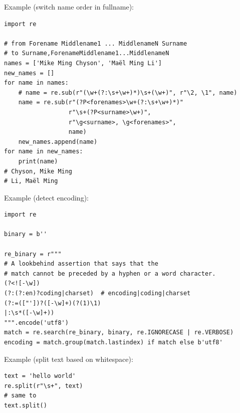 Example (switch name order in fullname):
\begin{lstlisting}
import re

# from Forename Middlename1 ... MiddlenameN Surname
# to Surname,ForenameMiddlename1...MiddlenameN
names = ['Mike Ming Chyson', 'Maël Ming Li']
new_names = []
for name in names:
    # name = re.sub(r"(\w+(?:\s+\w+)*)\s+(\w+)", r"\2, \1", name)
    name = re.sub(r"(?P<forenames>\w+(?:\s+\w+)*)"
                  r"\s+(?P<surname>\w+)",
                  r"\g<surname>, \g<forenames>",
                  name)
    new_names.append(name)
for name in new_names:
    print(name)
# Chyson, Mike Ming
# Li, Maël Ming  
\end{lstlisting}


Example (detect encoding):
\begin{lstlisting}
import re

binary = b''

re_binary = r"""
# A lookbehind assertion that says that the
# match cannot be preceded by a hyphen or a word character.
(?<![-\w]) 
(?:(?:en)?coding|charset)  # encoding|coding|charset
(?:=(["'])?([-\w]+)(?(1)\1)
|:\s*([-\w]+))
""".encode('utf8')
match = re.search(re_binary, binary, re.IGNORECASE | re.VERBOSE)
encoding = match.group(match.lastindex) if match else b'utf8'
\end{lstlisting}

Example (split text based on whitespace):
\begin{lstlisting}
text = 'hello world'
re.split(r"\s+", text)
# same to
text.split()  
\end{lstlisting}